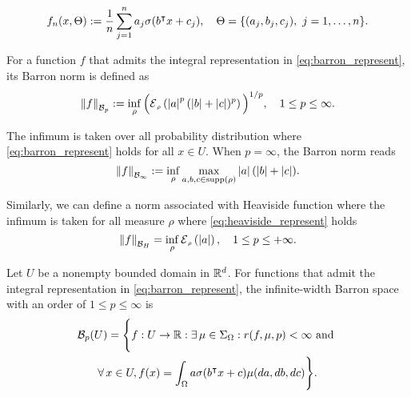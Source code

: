 \begin{equation}
    f_n(x, \Theta) := \frac{1}{n}
    \sum_{j=1}^n a_j 
        \sigma(b{}^{\intercal} x + c_j), 
    \quad \Theta = \{(a_j, b_j, c_j), \ j = 1, \dots, n\}.
\end{equation}

\begin{definition} For a function $f$ that admits the integral
    representation in \eqref{eq:barron_represent}, its Barron norm is defined as
    \begin{equation}\label{eq:barron_norm}
        \barronnorm{f}{p} := \inf_{\rho} \Big(\ERWi{\rho}{\abs{a}^p 
        (\abs{b} + \abs{c})^p}\Big)^{1/p},
        \quad 1 \leq p \leq \infty.
    \end{equation}
\end{definition}

The infimum is taken over all probability distribution where
\eqref{eq:barron_represent} holds for all $x \in U$. When $p = \infty$, the
Barron norm reads
\begin{equation}
    \label{eq:barron_infinite_norm}
    \left\| {f} \right\|_{\mathcal{B}_{\infty}} :=
    \inf_{\rho} \max_{a, b, c \in \operatorname*{supp}(\rho)} \left| a \right| (\left| b \right| + \left| c \right|).
\end{equation}

Similarly, we can define a norm associated with Heaviside function where the
infimum is taken for all measure $\rho$ where \eqref{eq:heaviside_represent}
holds
\begin{equation}
    \label{def:heaviside_norm}
    \norm{f}_{\mcal{B}_H} = \inf_{\rho} \ERWi{\rho}{\abs{a}},
    \quad 1 \leq p \leq +\infty.
\end{equation}

\begin{definition}
    \label{def:barron_space}
    Let $U$ be a nonempty bounded domain in $\mathbb{R}^d$. For functions that admit the
    integral representation in \eqref{eq:barron_represent}, the infinite-width
    Barron space with an order of $1 \leq p \leq \infty$ is
    \begin{multline}
        \label{eq:barron_space}
        \mathcal{B}_p(U) = \Bigg\{
            f: U \to \mathbb{R} : \exists\, \mu \in \Sigma_{\Omega}: 
            r(f, \mu, p) < \infty \textnormal{ and } \\
            \forall\, x \in U, f(x) = \int_{\Omega} a \sigma(b{}^{\intercal} x + c) \mu(da, db, dc)
        \Bigg\}.
    \end{multline}
\end{definition}

